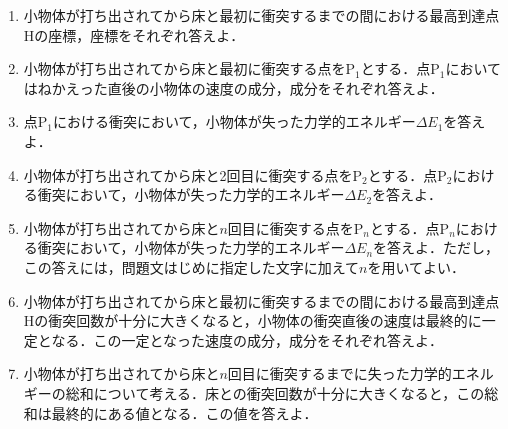 \begin{enumerate}[（1）]
  \setlength{\leftskip}{-1zw}
  \setlength{\itemindent}{1zw}\setlength{\labelsep}{0.5zw}
  \setlength{\labelwidth}{1zw}\setlength{\leftmargin}{1zw}
  \setlength{\itemsep}{0.5\baselineskip}
  \item 小物体が打ち出されてから床と最初に衝突するまでの間における最高到達点Hの\x 座標，\y 座標をそれぞれ答えよ．
  \item 小物体が打ち出されてから床と最初に衝突する点を$\text{P}_1$とする．点$\text{P}_1$においてはねかえった直後の小物体の速度の\x 成分，\y 成分をそれぞれ答えよ．
  \item 点$\text{P}_1$における衝突において，小物体が失った力学的エネルギー$\varDelta E_1$を答えよ．
  \item 小物体が打ち出されてから床と2回目に衝突する点を$\text{P}_2$とする．点$\text{P}_2$における衝突において，小物体が失った力学的エネルギー$\varDelta E_2$を答えよ．
  \item 小物体が打ち出されてから床と$n$回目に衝突する点を$\text{P}_n$とする．点$\text{P}_n$における衝突において，小物体が失った力学的エネルギー$\varDelta E_n$を答えよ．ただし，この答えには，問題文はじめに指定した文字に加えて$n$を用いてよい．
  \item 小物体が打ち出されてから床と最初に衝突するまでの間における最高到達点Hの衝突回数が十分に大きくなると，小物体の衝突直後の速度は最終的に一定となる．この一定となった速度の\x 成分，\y 成分をそれぞれ答えよ．
  \item 小物体が打ち出されてから床と$n$回目に衝突するまでに失った力学的エネルギーの総和について考える．床との衝突回数が十分に大きくなると，この総和は最終的にある値となる．この値を答えよ．
\end{enumerate}

